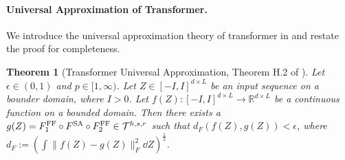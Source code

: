 \documentclass[12pt]{article}
\numberwithin{equation}{section}
\def\R{\mathbb{R}}
\let\cite\citep
\theoremstyle{theoremstyle}
\newtheorem{theorem}{Theorem}[section]
\numberwithin{equation}{section}
\numberwithin{theorem}{section}
\numberwithin{proposition}{section}
\numberwithin{definition}{section}
\numberwithin{lemma}{section}
\numberwithin{assumption}{section}
\numberwithin{remark}{section}
\begin{document}
\paragraph{Universal Approximation of Transformer.}
We introduce the universal approximation theory of transformer in \cite{su2025high} and restate the proof for completeness.
\begin{theorem}[Transformer Universal Approximation, Theorem H.2 of \cite{su2025high}]\label{thm:universal_approximation_no_parameter_bound}
Let $\epsilon\in(0,1) $ and $p\in[1,\infty)$.
Let $Z\in[-I,I]^{d\times L}$ be an input sequence on a bounder domain, where $I>0$.
Let $f(Z):[-I,I]^{d\times L}\to \R^{d\times L}$ be a continuous function on a bounded domain.
Then there exists a $g(Z)=F^{\rm FF}_1\circ F^{\rm SA}\circ F^{\rm FF}_2\in\mathcal{T}^{h,s,r}$ such that $d_F(f(Z),g(Z))<\epsilon$, where $d_F:=(\int\|f(Z)-g(Z)\|_F^2 \dd Z)^{\frac{1}{2}}$.
\end{theorem}
\end{document}
